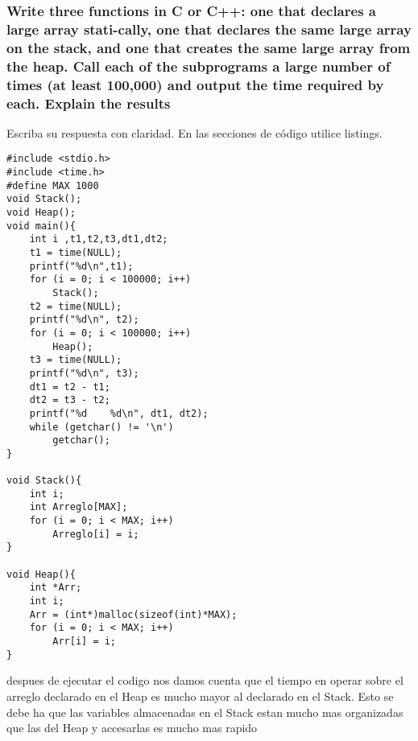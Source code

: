 \subsubsection{Write three functions in C or C++: one that declares a large array stati-cally, one that declares the same large array on the stack, and one that  creates the same large array from the heap. Call each of the subprograms a large number of times (at least 100,000) and output the time required by each. Explain the results}

Escriba su respuesta con claridad. En las secciones de código utilice listings.

\lstset{language = Python} 
\begin{lstlisting}[frame = single] %Comienzo del Código
#include <stdio.h>
#include <time.h>
#define MAX 1000
void Stack();
void Heap();
void main(){
	int i ,t1,t2,t3,dt1,dt2;
	t1 = time(NULL);
	printf("%d\n",t1);
	for (i = 0; i < 100000; i++)
		Stack();
	t2 = time(NULL);
	printf("%d\n", t2);
	for (i = 0; i < 100000; i++)
		Heap();
	t3 = time(NULL);
	printf("%d\n", t3);
	dt1 = t2 - t1;
	dt2 = t3 - t2;
	printf("%d    %d\n", dt1, dt2);
	while (getchar() != '\n')
		getchar();
}

void Stack(){
	int i;
	int Arreglo[MAX];
	for (i = 0; i < MAX; i++)
		Arreglo[i] = i;
}

void Heap(){
	int *Arr;
	int i;
	Arr = (int*)malloc(sizeof(int)*MAX);
	for (i = 0; i < MAX; i++)
		Arr[i] = i;
}

\end{lstlisting}
despues de ejecutar el codigo  nos damos cuenta que el tiempo en operar sobre el arreglo declarado en el Heap es mucho mayor al declarado en el Stack. Esto se debe ha que las variables almacenadas en el Stack estan mucho mas organizadas que las del Heap y accesarlas es mucho mas rapido

	